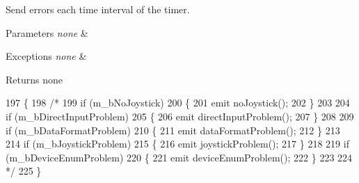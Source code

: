 Send errors each time interval of the timer. 


\begin{DoxyParams}{Parameters}
{\em none} & \\
\hline
\end{DoxyParams}

\begin{DoxyExceptions}{Exceptions}
{\em none} & \\
\hline
\end{DoxyExceptions}
\begin{DoxyReturn}{Returns}
none 
\end{DoxyReturn}

\begin{DoxyCode}
197 \{
198     \textcolor{comment}{/*}
199 \textcolor{comment}{    if (m\_bNoJoystick)}
200 \textcolor{comment}{    \{}
201 \textcolor{comment}{        emit noJoystick();}
202 \textcolor{comment}{    \}}
203 \textcolor{comment}{}
204 \textcolor{comment}{    if (m\_bDirectInputProblem)}
205 \textcolor{comment}{    \{}
206 \textcolor{comment}{        emit directInputProblem();}
207 \textcolor{comment}{    \}}
208 \textcolor{comment}{}
209 \textcolor{comment}{    if (m\_bDataFormatProblem)}
210 \textcolor{comment}{    \{}
211 \textcolor{comment}{        emit dataFormatProblem();}
212 \textcolor{comment}{    \}}
213 \textcolor{comment}{}
214 \textcolor{comment}{    if (m\_bJoystickProblem)}
215 \textcolor{comment}{    \{}
216 \textcolor{comment}{        emit joystickProblem();}
217 \textcolor{comment}{    \}}
218 \textcolor{comment}{}
219 \textcolor{comment}{    if (m\_bDeviceEnumProblem)}
220 \textcolor{comment}{    \{}
221 \textcolor{comment}{        emit deviceEnumProblem();}
222 \textcolor{comment}{    \}}
223 \textcolor{comment}{}
224 \textcolor{comment}{        */}
225 \}
\end{DoxyCode}


